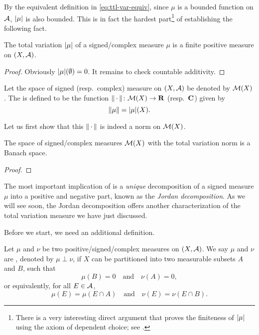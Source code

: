 By the equivalent definition in \eqref{eq:ttl-var-equiv}, since $\mu$ is a bounded function on $\mathcal{A}$, $\lvert \mu \rvert$ is also bounded. This is in fact the hardest part\footnote{There is a very interesting direct argument that proves the finiteness of $\lvert \mu \rvert$ using the axiom of dependent choice; see \cite{Rudin_realcomplex_1987,Ambrosio_2011,Axler_2020}.} of establishing the following fact.
\begin{thm}
    The total variation $\lvert \mu \rvert$ of a signed/complex measure $\mu$ is a finite positive measure on $(X,\mathcal{A})$.
\end{thm}
\begin{proof}
    Obviously $\lvert \mu \rvert(\emptyset) = 0$. It remains to check countable additivity.
\end{proof}

\begin{defn}
    Let the space of signed (resp.\ complex) measure on $(X,\mathcal{A})$ be denoted by $\mathcal{M}(X)$. The  is defined to be the function $\lVert \,\cdot\, \rVert\colon \mathcal{M}(X)\to \mathbf{R}$ (resp.\ $\mathbf{C}$) given by \[
        \lVert \mu \rVert = \lvert \mu \rvert(X).
    \]
\end{defn}

Let us first show that this $\lVert \,\cdot\, \rVert$ is indeed a norm on $\mathcal{M}(X)$.

\begin{thm}
    The space of signed/complex measures $\mathcal{M}(X)$ with the total variation norm is a Banach space.
\end{thm}
\begin{proof}
    
\end{proof}

The most important implication of  is a \emph{unique} decomposition of a signed measure $\mu$ into a positive and negative part, known as the \emph{Jordan decomposition}. As we will see soon, the Jordan decomposition offers another characterization of the total variation measure we have just discussed.

Before we start, we need an additional definition.

\begin{defn}
    Let $\mu$ and $\nu$ be two positive/signed/complex measures on $(X, \mathcal{A})$. We say $\mu$ and $\nu$ are , denoted by $\mu \perp \nu$, if $X$ can be partitioned into two measurable subsets $A$ and $B$, such that \[
        \mu(B) = 0 \quad \text{and} \quad \nu(A) = 0,
    \] or equivalently, for all $E\in \mathcal{A}$, \[
        \mu(E) = \mu(E\cap A) \quad \text{and} \quad \nu(E) = \nu(E \cap B).
    \]
\end{defn}

